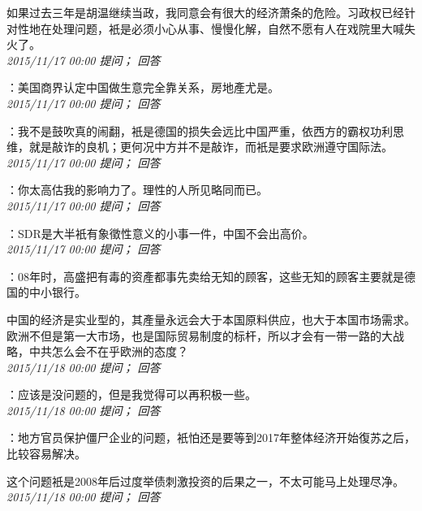 \documentclass[twocolumn]{ctexart}
\begin{document}
如果过去三年是胡温继续当政，我同意会有很大的经济萧条的危险。习政权已经针对性地在处理问题，衹是必须小心从事、慢慢化解，自然不愿有人在戏院里大喊失火了。\\

\textit{\hfill\noindent\small 2015/11/17 00:00 提问； 回答}

：美国商界认定中国做生意完全靠关系，房地產尤是。\\

\textit{\hfill\noindent\small 2015/11/17 00:00 提问； 回答}

：我不是鼓吹真的闹翻，衹是德国的损失会远比中国严重，依西方的霸权功利思维，就是敲诈的良机；更何况中方并不是敲诈，而衹是要求欧洲遵守国际法。\\

\textit{\hfill\noindent\small 2015/11/17 00:00 提问； 回答}

：你太高估我的影响力了。理性的人所见略同而已。\\

\textit{\hfill\noindent\small 2015/11/17 00:00 提问； 回答}

：SDR是大半衹有象徵性意义的小事一件，中国不会出高价。\\

\textit{\hfill\noindent\small 2015/11/17 00:00 提问； 回答}

：08年时，高盛把有毒的资產都事先卖给无知的顾客，这些无知的顾客主要就是德国的中小银行。

中国的经济是实业型的，其產量永远会大于本国原料供应，也大于本国市场需求。欧洲不但是第一大市场，也是国际贸易制度的标杆，所以才会有一带一路的大战略，中共怎么会不在乎欧洲的态度？\\

\textit{\hfill\noindent\small 2015/11/18 00:00 提问； 回答}

：应该是没问题的，但是我觉得可以再积极一些。\\

\textit{\hfill\noindent\small 2015/11/18 00:00 提问； 回答}

：地方官员保护僵尸企业的问题，衹怕还是要等到2017年整体经济开始復苏之后，比较容易解决。

这个问题衹是2008年后过度举债刺激投资的后果之一，不太可能马上处理尽净。\\

\textit{\hfill\noindent\small 2015/11/18 00:00 提问； 回答}
\end{document}
